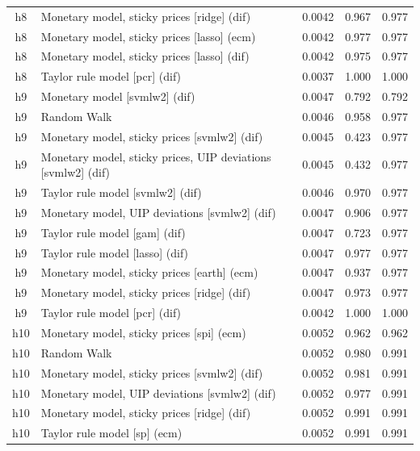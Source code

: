 \begin{ThreePartTable}
\begin{longtable}[t]{cp{5.5cm}ccc}
h8 & \raggedright Monetary model, sticky prices [ridge] (dif) & 0.0042 & 0.967 & 0.977\\
h8 & \raggedright Monetary model, sticky prices [lasso] (ecm) & 0.0042 & 0.977 & 0.977\\
h8 & \raggedright Monetary model, sticky prices [lasso] (dif) & 0.0042 & 0.975 & 0.977\\
h8 & \raggedright Taylor rule model [pcr] (dif) & 0.0037 & 1.000 & 1.000\\
\addlinespace
h9 & \raggedright Monetary model [svmlw2] (dif) & 0.0047 & 0.792 & 0.792\\
h9 & \raggedright Random Walk & 0.0046 & 0.958 & 0.977\\
h9 & \raggedright Monetary model, sticky prices [svmlw2] (dif) & 0.0045 & 0.423 & 0.977\\
h9 & \raggedright Monetary model, sticky prices, UIP deviations [svmlw2] (dif) & 0.0045 & 0.432 & 0.977\\
h9 & \raggedright Taylor rule model [svmlw2] (dif) & 0.0046 & 0.970 & 0.977\\
h9 & \raggedright Monetary model, UIP deviations [svmlw2] (dif) & 0.0047 & 0.906 & 0.977\\
h9 & \raggedright Taylor rule model [gam] (dif) & 0.0047 & 0.723 & 0.977\\
h9 & \raggedright Taylor rule model [lasso] (dif) & 0.0047 & 0.977 & 0.977\\
h9 & \raggedright Monetary model, sticky prices [earth] (ecm) & 0.0047 & 0.937 & 0.977\\
h9 & \raggedright Monetary model, sticky prices [ridge] (dif) & 0.0047 & 0.973 & 0.977\\
h9 & \raggedright Taylor rule model [pcr] (dif) & 0.0042 & 1.000 & 1.000\\
\addlinespace
h10 & \raggedright Monetary model, sticky prices [spi] (ecm) & 0.0052 & 0.962 & 0.962\\
h10 & \raggedright Random Walk & 0.0052 & 0.980 & 0.991\\
h10 & \raggedright Monetary model, sticky prices [svmlw2] (dif) & 0.0052 & 0.981 & 0.991\\
h10 & \raggedright Monetary model, UIP deviations [svmlw2] (dif) & 0.0052 & 0.977 & 0.991\\
h10 & \raggedright Monetary model, sticky prices [ridge] (dif) & 0.0052 & 0.991 & 0.991\\
h10 & \raggedright Taylor rule model [sp] (ecm) & 0.0052 & 0.991 & 0.991\\

\end{longtable}
\end{ThreePartTable}
